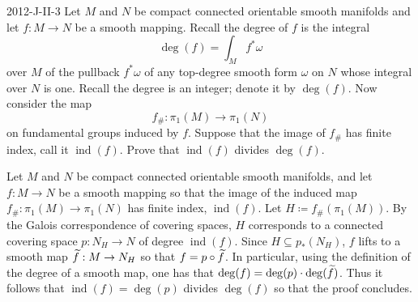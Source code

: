 \documentclass{article}
\begin{document}
	\begin{prb}{2012-J-II-3}
		Let $M$ and $N$ be compact connected orientable smooth manifolds and let $f: M \to N$ be a smooth mapping. Recall the degree of $f$ is the integral 
		\begin{equation*}
			\deg(f) = \int_{M}f^{\ast}\omega
		\end{equation*}
		over $M$ of the pullback $f^{\ast}\omega$ of any top-degree smooth form $\omega$ on $N$ whose integral over $N$ is one. Recall the degree is an integer; denote it by $\deg(f)$. Now consider the map 
		\begin{equation*}
			f_{\#}: \pi_{1}(M) \to \pi_{1}(N)
		\end{equation*}
		on fundamental groups induced by $f$. Suppose that the image of $f_{\#}$ has finite index, call it $\operatorname{ind}(f)$. Prove that $\operatorname{ind}(f)$ divides $\deg(f)$. 
	\end{prb}
	Let $M$ and $N$ be compact connected orientable smooth manifolds, and let $f: M \to N$ be a smooth mapping so that the image of the induced map $f_{\#}: \pi_{1}(M) \to\pi_{1}(N)$ has finite index, $\operatorname{ind}(f)$. Let $H \coloneqq f_{\#}(\pi_{1}(M))$. By the Galois correspondence of covering spaces, $H$ corresponds to a connected covering space $p: N_{H} \to N$ of degree $\operatorname{ind}(f)$. Since $H \subseteq p_{\ast}(N_{H})$, $f$ lifts to a smooth map $\widetilde{f}: M \to N_{H}$ so that $f = p \circ \widetilde{f}$. In particular, using the definition of the degree of a smooth map, one has that $\deg(f) = \deg(p) \cdot \deg(\widetilde{f})$. Thus it follows that $\operatorname{ind}(f) = \deg(p)$ divides $\deg(f)$ so that the proof concludes. 
	
\end{document}
